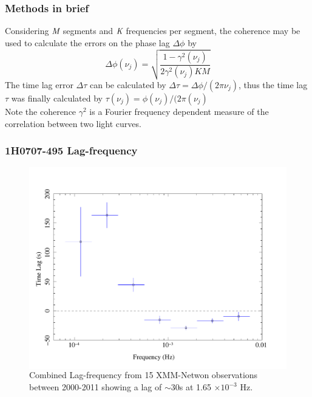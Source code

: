 \documentclass[]{beamer}
\begin{document}
\begin{frame}
\frametitle{Methods in brief}
Considering $\textit M$ segments and $\textit K$ frequencies per segment, the coherence may be used to calculate the errors on the phase lag $\Delta\phi$ by 
\begin{equation}
\Delta\phi(\nu_j) =  \sqrt{\frac{1-\gamma^2(\nu_j)}{2\gamma^2(\nu_j)KM}}
\end{equation}
The time lag error $\Delta \tau$ can be calculated by $\Delta \tau=\Delta\phi/(2\pi\nu_j)$, thus the time lag $\tau$ was finally calculated by 
$\tau(\nu_j)=\phi(\nu_j)/(2\pi(\nu_j)$
\vspace{2mm}\\
Note the coherence $\gamma^2$ is a Fourier frequency dependent measure of the correlation between two light curves.
\end{frame}


\begin{frame}
\frametitle{1H0707-495 Lag-frequency}
\begin{figure}\centering
\colorbox{white}{\includegraphics[scale=.25]{1H0707-495_lagfreq_fullycomb.pdf}}\\
Combined Lag-frequency from 15 XMM-Netwon observations between 2000-2011 showing a lag of $\sim30$s at 1.65 $\times 10^{-3}$ Hz.
\end{figure}
\end{frame}
\end{document}
